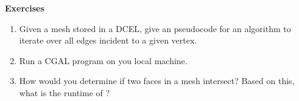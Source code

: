 \noindent \textbf{Exercises}


\begin{enumerate}
	\item Given a mesh stored in a DCEL, give an pseudocode for an algorithm to iterate over all edges incident to a given vertex.
	
	\item Run a CGAL program on you local machine.
	
	\item How would you determine if two faces in a mesh intersect? Based on this, what is the runtime of ?
	
\end{enumerate}

\pagebreak